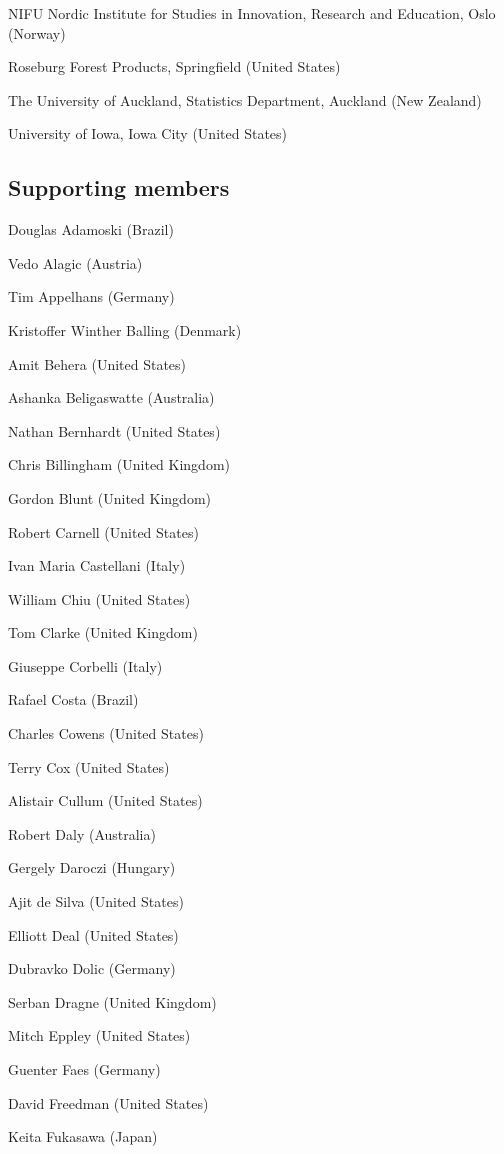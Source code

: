 NIFU Nordic Institute for Studies in Innovation, Research and Education, Oslo (Norway)

Roseburg Forest Products, Springfield (United States)

The University of Auckland, Statistics Department, Auckland (New Zealand)

University of Iowa, Iowa City (United States)

\subsection{Supporting members}\label{supporting-members}

Douglas Adamoski (Brazil)

Vedo Alagic (Austria)

Tim Appelhans (Germany)

Kristoffer Winther Balling (Denmark)

Amit Behera (United States)

Ashanka Beligaswatte (Australia)

Nathan Bernhardt (United States)

Chris Billingham (United Kingdom)

Gordon Blunt (United Kingdom)

Robert Carnell (United States)

Ivan Maria Castellani (Italy)

William Chiu (United States)

Tom Clarke (United Kingdom)

Giuseppe Corbelli (Italy)

Rafael Costa (Brazil)

Charles Cowens (United States)

Terry Cox (United States)

Alistair Cullum (United States)

Robert Daly (Australia)

Gergely Daroczi (Hungary)

Ajit de Silva (United States)

Elliott Deal (United States)

Dubravko Dolic (Germany)

Serban Dragne (United Kingdom)

Mitch Eppley (United States)

Guenter Faes (Germany)

David Freedman (United States)

Keita Fukasawa (Japan)

